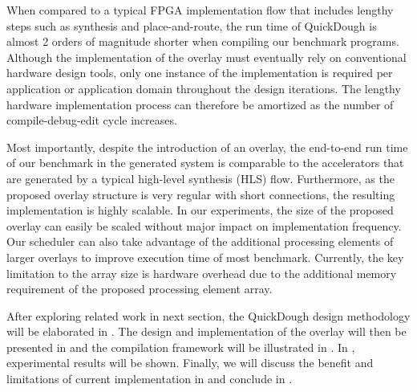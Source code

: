 When compared to a typical FPGA implementation flow that includes lengthy steps such as synthesis and place-and-route, the run time of QuickDough is almost 2 orders of magnitude shorter when compiling our benchmark programs.
Although the implementation of the overlay must eventually rely on conventional hardware design tools, only one instance of the implementation is required per application or application domain throughout the design iterations.  The lengthy hardware implementation process can therefore be amortized as the number of compile-debug-edit cycle increases.

Most importantly, despite the introduction of an overlay, the end-to-end run time of our benchmark
in the generated system is comparable to the accelerators that are generated by a typical high-level
synthesis (HLS) flow.
Furthermore, as the proposed overlay structure is very regular with short connections, the resulting implementation is highly scalable.
In our experiments, the size of the proposed overlay can easily be scaled without major impact on implementation frequency.
Our scheduler can also take advantage of the additional processing elements of larger overlays to improve execution time of most benchmark.
Currently, the key limitation to the array size is hardware overhead due to the additional memory requirement of the proposed processing element array.


After exploring related work in next section, the QuickDough design methodology will be elaborated in .  The design and implementation of the overlay will then be presented in   and the compilation framework will be illustrated in .  In , experimental results will be shown.  Finally, we will discuss the benefit and limitations of current implementation in  and conclude in .
